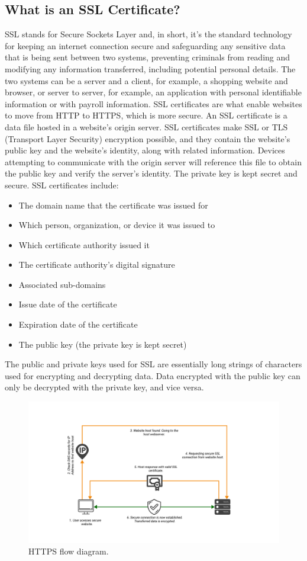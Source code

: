 \subsection{What is an SSL Certificate?}\label{subsec:what-is-an-ssl-certificate?}
SSL stands for Secure Sockets Layer and, in short, it's the standard technology for keeping an internet connection
secure and safeguarding any sensitive data that is being sent between two systems, preventing criminals from reading
and modifying any information transferred, including potential personal details.
The two systems can be a server and a client, for example, a shopping website and browser, or server to server,
for example, an application with personal identifiable information or with payroll information.
SSL certificates are what enable websites to move from HTTP to HTTPS, which is more secure.
An SSL certificate is a data file hosted in a website's origin server.
SSL certificates make SSL or TLS (Transport Layer Security) encryption possible, and they contain the website's
public key and the website's identity, along with related information.
Devices attempting to communicate with the origin server will reference this file to obtain the public key and verify
the server's identity.
The private key is kept secret and secure.
SSL certificates include:
\begin{itemize}
    \item The domain name that the certificate was issued for
    \item Which person, organization, or device it was issued to
    \item Which certificate authority issued it
    \item The certificate authority's digital signature
    \item Associated sub-domains
    \item Issue date of the certificate
    \item Expiration date of the certificate
    \item The public key (the private key is kept secret)
\end{itemize}
The public and private keys used for SSL are essentially long strings of characters used for encrypting and decrypting data.
Data encrypted with the public key can only be decrypted with the private key, and vice versa.
\begin{figure}[H]
    \centering
    \includegraphics[width=1\textwidth]{Pictures/HTTPS_Flow}
    \caption{HTTPS flow diagram.}\label{fig:figure6}
\end{figure}

